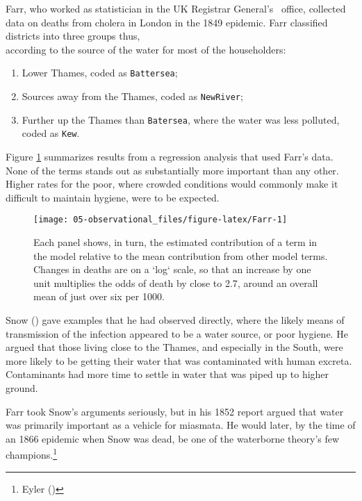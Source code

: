\documentclass[
  10ptls,
  b5paper]{book}
\providecommand{\tightlist}{%
  \setlength{\itemsep}{0pt}\setlength{\parskip}{0pt}}
\begin{document}
Farr, who worked as statistician in the UK Registrar General's~ office, collected data on deaths from cholera in London in the 1849 epidemic. Farr classified districts into three groups thus,\\
according to the source of the water for most of the householders:

\begin{enumerate}
\def\labelenumi{\arabic{enumi})}
\tightlist
\item
  Lower Thames, coded as \texttt{Battersea};\\
\item
  Sources away from the Thames, coded as \texttt{NewRiver};\\
\item
  Further up the Thames than \texttt{Batersea}, where the water was less polluted, coded as \texttt{Kew}.
\end{enumerate}

Figure \ref{fig:Farr} summarizes results from a regression analysis that used Farr's data. None of the terms stands out as substantially more important than any other. Higher rates for the poor, where crowded conditions would commonly make it difficult to maintain hygiene, were to be expected.

\begin{figure}

{\centering \texttt{[image: 05-observational\_files/figure-latex/Farr-1]} 

}

\caption{Each panel shows, in turn, the estimated contribution
of a term in the model relative to the mean contribution from 
other model terms. Changes in deaths are on a `log` scale, so 
that an increase by one unit multiplies the odds of death by 
close to 2.7, around an overall mean of just over six per 1000.
}\label{fig:Farr}
\end{figure}

Snow () gave examples that he had observed directly, where the likely means of transmission of the infection appeared to be a water source, or poor hygiene. He argued that those living close to the Thames, and especially in the South, were more likely to be getting their water that was contaminated with human excreta. Contaminants had more time to settle in water that was piped up to higher ground.

Farr took Snow's arguments seriously, but in his 1852 report argued that water was primarily important as a vehicle for miasmata. He would later, by the time of an 1866 epidemic when Snow was dead, be one of the waterborne theory's few champions.\footnote{Eyler ()}
\end{document}
